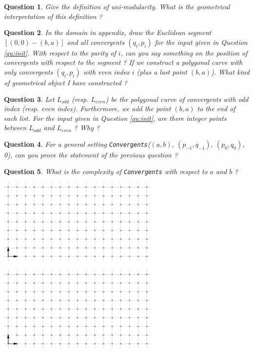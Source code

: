 \documentclass[a4paper, 11pt]{article}
\newtheorem{qu}{Question}
\begin{document}
\begin{qu}Give the definition of uni-modularity. What is the
  geometrical interpretation of this definition ?
\end{qu}


\begin{qu}
  In the domain in appendix, draw the Euclidean segment
  $[(0,0)-(b,a)]$ and all convergents $(q_i,p_i)$ for the input given
  in Question \ref{qu:init}. With respect to the parity of $i$, can
  you say something on the position of convergents with respect to the
  segment ? If we construct a polygonal curve with only convergents
  $(q_i,p_i)$ with even index $i$ (plus a last point $(b,a)$). What
  kind of geometrical object I have constructed ?
\end{qu}


\begin{qu}
  Let $L_{odd}$ (resp. $L_{even}$) be the polygonal curve of convergents with
  odd index (resp. even index). Furthermore, we add the point $(b,a)$
  to the end of each list. For the input given in Question
  \ref{qu:init}, are there integer points between $L_{odd}$ and
  $L_{even}$ ? Why ?
\end{qu}


\begin{qu}
  For a general setting \emph{\texttt{Convergents}}($(a,b)$, $(p_{-1},q_{-1})$,
  $(p_0,q_0)$, 0), can you prove the statement of the previous
  question ?
\end{qu}

\begin{qu}
  What is the complexity of \emph{\texttt{Convergents}} with respect
  to $a$ and $b$ ?
\end{qu}





\newpage
\appendix

\begin{center}
  \includegraphics[width=8cm]{domain}
\end{center}


\begin{center}
  \includegraphics[width=8cm]{domain}
\end{center}
\end{document}
